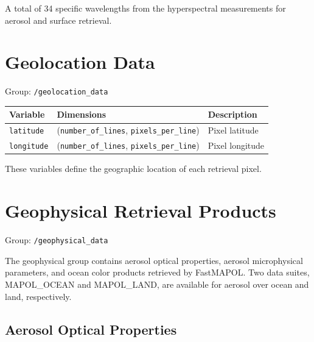 \documentclass[
  11pt,
  letterpaper,
]{scrreprt}
\begin{document}
A total of 34 specific wavelengths from the hyperspectral measurements
for aerosol and surface retrieval.

\section{Geolocation Data}\label{geolocation-data}

Group: \texttt{/geolocation\_data}

\begin{longtable}[]{@{}
  >{\raggedright\arraybackslash}p{}
  >{\raggedright\arraybackslash}p{}
  >{\raggedright\arraybackslash}p{}@{}}
\toprule\noalign{}
\begin{minipage}[b]{\linewidth}\raggedright
Variable
\end{minipage} & \begin{minipage}[b]{\linewidth}\raggedright
Dimensions
\end{minipage} & \begin{minipage}[b]{\linewidth}\raggedright
Description
\end{minipage} \\
\midrule\noalign{}
\endhead
\bottomrule\noalign{}
\endlastfoot
\texttt{latitude} & (\texttt{number\_of\_lines},
\texttt{pixels\_per\_line}) & Pixel latitude \\
\texttt{longitude} & (\texttt{number\_of\_lines},
\texttt{pixels\_per\_line}) & Pixel longitude \\
\end{longtable}

These variables define the geographic location of each retrieval pixel.

\section{Geophysical Retrieval
Products}\label{geophysical-retrieval-products}

Group: \texttt{/geophysical\_data}

The geophysical group contains aerosol optical properties, aerosol
microphysical parameters, and ocean color products retrieved by
FastMAPOL. Two data suites, MAPOL\_OCEAN and MAPOL\_LAND, are available
for aerosol over ocean and land, respectively.

\subsection{Aerosol Optical
Properties}\label{aerosol-optical-properties}
\end{document}
